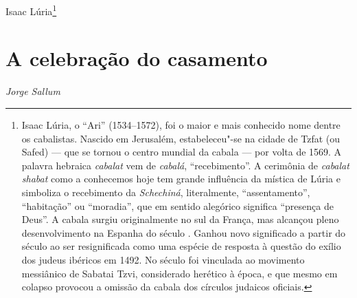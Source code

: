 \begin{flushright}
Isaac Lúria\footnote{Isaac Lúria, o ``Ari'' (1534--1572), foi o maior e mais conhecido nome dentre os cabalistas. Nascido em Jerusalém, estabeleceu"-se na cidade de Tzfat (ou Safed) --- que se tornou o centro mundial da cabala --- por volta de 1569. A palavra hebraica \emph{cabalat} vem de \emph{cabalá}, ``recebimento''. A cerimônia de \emph{cabalat shabat} como a conhecemos hoje tem grande influência da mística de Lúria e simboliza o recebimento da \emph{Schechiná}, literalmente, ``assentamento'', ``habitação'' ou ``moradia'', que em sentido alegórico significa ``presença de Deus''. A cabala surgiu originalmente no sul da França, mas alcançou pleno desenvolvimento na Espanha do século . Ganhou novo significado a partir do século  ao ser resignificada como uma espécie de resposta à questão do exílio dos judeus ibéricos em 1492. No século  foi vinculada ao movimento messiânico de Sabatai Tzvi, considerado herético à época, e que mesmo em colapso provocou a omissão da cabala dos círculos judaicos oficiais.}
\end{flushright}

\chapter*{A celebração do casamento}

\begin{flushright}
\emph{Jorge Sallum}
\end{flushright}

